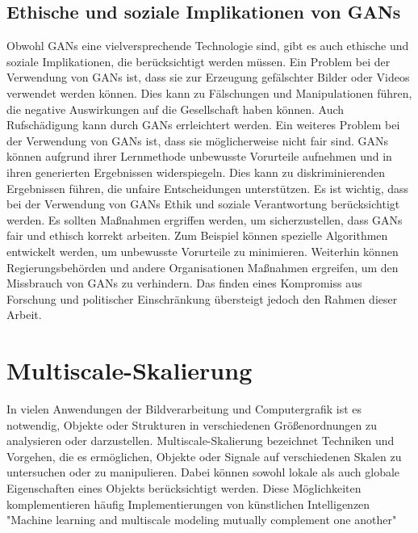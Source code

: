    \subsection{Ethische und soziale Implikationen von GANs}
    
        Obwohl GANs eine vielversprechende Technologie sind, gibt es auch ethische und soziale Implikationen, die berücksichtigt werden müssen.      
        Ein Problem bei der Verwendung von GANs ist, dass sie zur Erzeugung gefälschter Bilder oder Videos verwendet werden können.      
        Dies kann zu Fälschungen und Manipulationen führen, die negative Auswirkungen auf die Gesellschaft haben können.
        Auch Rufschädigung kann durch GANs errleichtert werden.
        Ein weiteres Problem bei der Verwendung von GANs ist, dass sie möglicherweise nicht fair sind.      
        GANs können aufgrund ihrer Lernmethode unbewusste Vorurteile aufnehmen und in ihren generierten Ergebnissen widerspiegeln.      
        Dies kann zu diskriminierenden Ergebnissen führen, die unfaire Entscheidungen unterstützen.
        Es ist wichtig, dass bei der Verwendung von GANs Ethik und soziale Verantwortung berücksichtigt werden.      
        Es sollten Maßnahmen ergriffen werden, um sicherzustellen, dass GANs fair und ethisch korrekt arbeiten.      
        Zum Beispiel können spezielle Algorithmen entwickelt werden, um unbewusste Vorurteile zu minimieren.      
        Weiterhin können Regierungsbehörden und andere Organisationen Maßnahmen ergreifen, um den Missbrauch von GANs zu verhindern.   
        Das finden eines Kompromiss aus Forschung und politischer Einschränkung übersteigt jedoch den Rahmen dieser Arbeit.      
    
\section{Multiscale-Skalierung}

    In vielen Anwendungen der Bildverarbeitung und Computergrafik ist es notwendig, Objekte oder Strukturen in verschiedenen Größenordnungen zu analysieren oder darzustellen.      
    Multiscale-Skalierung bezeichnet Techniken und Vorgehen, die es ermöglichen, Objekte oder Signale auf verschiedenen Skalen zu untersuchen oder zu manipulieren.      
    Dabei können sowohl lokale als auch globale Eigenschaften eines Objekts berücksichtigt werden.
    Diese Möglichkeiten komplementieren häufig Implementierungen von künstlichen Intelligenzen
    "Machine learning and multiscale modeling mutually complement one another"
    
